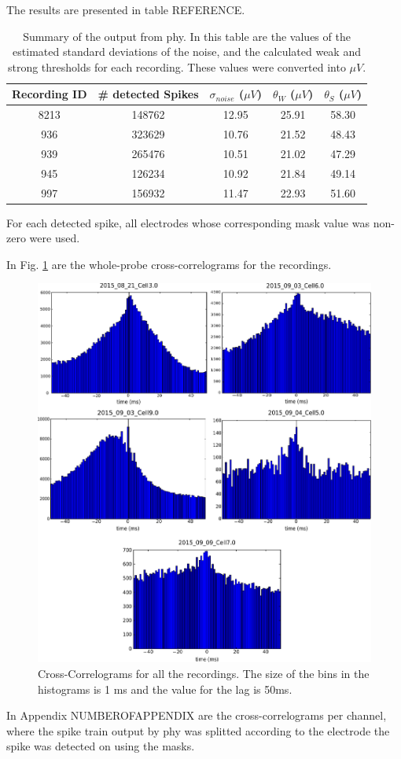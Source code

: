 \documentclass{article}
\begin{document}
The results are presented in table REFERENCE.

\begin{table}[!h]

\begin{center}
\begin{tabular}{ccccc}
Recording ID & \# detected Spikes & $\sigma_{noise}$ ($\mu V$) & $\theta_W$ ($\mu V$) & $\theta_S$ ($\mu V$) \\ \hline
8213 & 148762 &  12.95 & 25.91 & 58.30 \\ 
936 & 323629 & 10.76 & 21.52 & 48.43 \\ 
939 & 265476 & 10.51 & 21.02 & 47.29 \\ 
945 & 126234 & 10.92 & 21.84 & 49.14 \\ 
997 & 156932 & 11.47 & 22.93 & 51.60 \\ 
\end{tabular}
\end{center}
\caption{Summary of the output from phy. In this table are the values of the estimated standard deviations of the noise, and the calculated weak and strong thresholds for each recording. These values were converted into $\mu V$.}
\label{tab:results-from-phy}
\end{table}

For each detected spike, all electrodes whose corresponding mask value was non-zero were used.

In Fig. \ref{fig:CC} are the whole-probe cross-correlograms for the recordings.

\begin{figure}[!h]
	\centering
	\includegraphics[width=\linewidth]{CC.pdf}
	\caption{Cross-Correlograms for all the recordings. The size of the bins in the histograms is 1 ms and the value for the lag is 50ms.
}
\label{fig:CC}
\end{figure}

In Appendix NUMBEROFAPPENDIX are the cross-correlograms per channel, where the spike train output by phy was splitted according to the electrode the spike was detected on using the masks.
\end{document}
